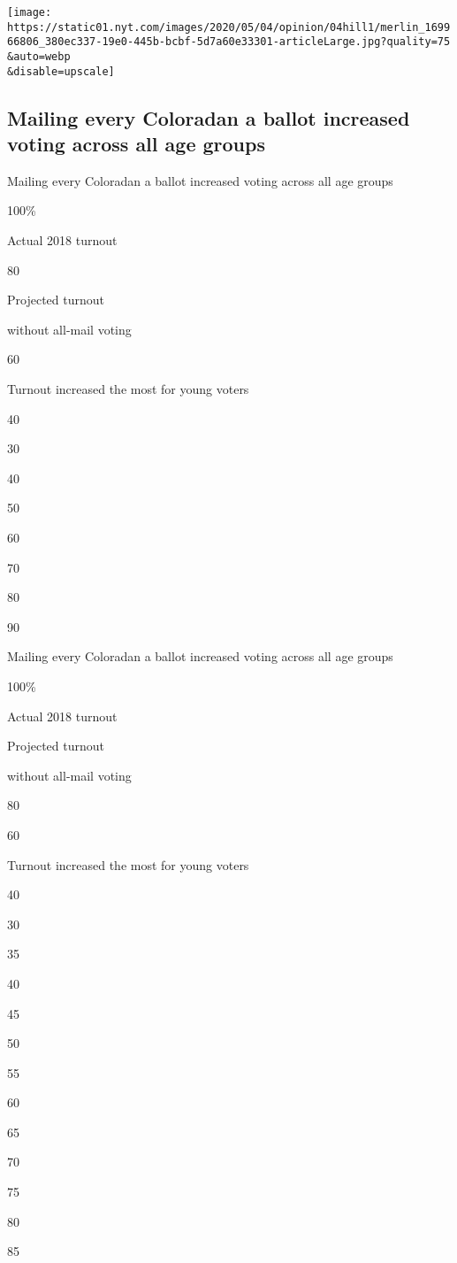 \texttt{[image: https://static01.nyt.com/images/2020/05/04/opinion/04hill1/merlin\_169966806\_380ec337-19e0-445b-bcbf-5d7a60e33301-articleLarge.jpg?quality=75\\\&auto=webp\\\&disable=upscale]}

\hypertarget{mailing-every-coloradan-a-ballot-increased-voting-across-all-age-groups}{%
\subsection{Mailing every Coloradan a ballot increased voting across all
age
groups}\label{mailing-every-coloradan-a-ballot-increased-voting-across-all-age-groups}}

Mailing every Coloradan a ballot increased voting across all age groups

100\%

Actual 2018 turnout

80

Projected turnout

without all-mail voting

60

Turnout increased the most for young voters

40

30

40

50

60

70

80

90

Mailing every Coloradan a ballot increased voting across all age groups

100\%

Actual 2018 turnout

Projected turnout

without all-mail voting

80

60

Turnout increased the most for young voters

40

30

35

40

45

50

55

60

65

70

75

80

85

